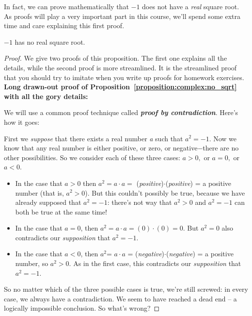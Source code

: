 In fact, we can prove mathematically that $-1$ does not have a \emph{real} square root. As proofs will play a very important part in this course, we'll spend some extra time and care explaining this first proof.

\begin{prop}\label{proposition:complex:no_sqrt} $-1$ has no real square root.
\end{prop}
\begin{proof}
We give two proofs of this proposition. The first one explains all
the details, while the second proof is more streamlined. It is the streamlined
proof that you should try to imitate when you write up proofs for
homework exercises.
\medskip{}
\newline
\noindent \textbf{Long drawn-out proof of Proposition~\ref{proposition:complex:no_sqrt} with all the gory details:} 

We will use a common proof technique called {\bf \emph{ proof by contradiction}}. 
Here's how it goes:

First we \emph{suppose} that there exists a real number \emph{a} such that
$a^{2}=-1$. Now we know that any real number is either positive, or zero, or negative$-$there are no other possibilities. So we consider each of these three cases: $a>0,$ or $a=0,$ or $a<0$.

\begin{itemize}
\item
In the case that $a>0$ then $a^{2}= a\cdot a =$ (\emph{positive})$\cdot$(\emph{positive})
= a positive number (that is, $a^{2}>0$). But this couldn't possibly
be true, because we have already supposed that $a^{2}=-1$: there's
not way that $a^{2}>0$ and $a^{2}=-1$ can both be true at the same
time!

\item
In the case that $a=0$, then $a^{2}=a\cdot a = (0)\cdot(0)
= 0$. But $a^{2}=0$ also contradicts our \emph{supposition} that $a^{2}=-1$.
\item
In the case that $a<0$, then $a^{2}$= $a\cdot a$ = (\emph{negative})$\cdot$(\emph{negative})
= a positive number, so $a^{2}>0$. As in the first case, this contradicts
our \emph{supposition} that $a^{2}=-1$.
\end{itemize}

So no matter which of the three possible cases is true, we're still
screwed: in every case, we always have a contradiction. We seem to have reached a dead end -- a logically impossible conclusion. So what's wrong?


\end{proof}

